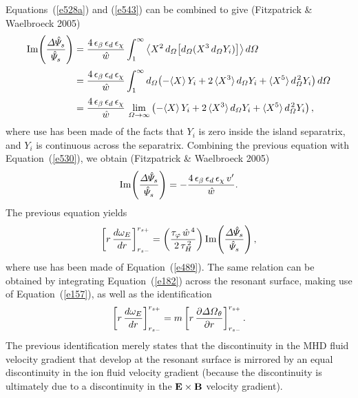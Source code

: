 \documentclass[notitlepage,12pt]{article}
\begin{document}
Equations~(\ref{e528a}) and (\ref{e543}) can be combined to give (Fitzpatrick \& Waelbroeck 2005)
\begin{align}
{\rm Im}\!\left(\frac{{\mit\Delta}\hat{\mit\Psi}_s}{\hat{\mit\Psi}_s}\right) &=\frac{4\,\epsilon_\beta\,\epsilon_d\,\epsilon_\chi}{\hat{w}}\int_1^\infty
\left\langle X^{2}\,d_{\mit\Omega}\!\left[d_{\mit\Omega}(X^3\,d_{\mit\Omega}Y_i)\right]\right\rangle d{\mit\Omega}\nonumber\\[0.5ex]
&=\frac{4\,\epsilon_\beta\,\epsilon_d\,\epsilon_\chi}{\hat{w}}\int_1^\infty d_{\mit\Omega}\!\left(-\langle X\rangle\,Y_i
+2\,\langle X^3\rangle\,d_{\mit\Omega} Y_i + \langle X^5\rangle\,d_{\mit\Omega}^{\,2} Y_i\right)d{\mit\Omega}\nonumber\\[0.5ex]
&= \frac{4\,\epsilon_\beta\,\epsilon_d\,\epsilon_\chi}{\hat{w}}\,\lim_{\mit\Omega\rightarrow\infty}\left(-\langle X\rangle\,Y_i
+2\,\langle X^3\rangle\,d_{\mit\Omega} Y_i + \langle X^5\rangle\,d_{\mit\Omega}^{\,2} Y_i\right),
\end{align}
where use has been made of the facts that $Y_i$ is zero inside the island separatrix, and $Y_i$ is continuous across the separatrix.
Combining the previous equation with Equation~(\ref{e530}), we obtain (Fitzpatrick \& Waelbroeck 2005)
\begin{equation}\label{e545}
{\rm Im}\!\left(\frac{{\mit\Delta}\hat{\mit\Psi}_s}{\hat{\mit\Psi}_s}\right)  =- \frac{4\,\epsilon_\beta\,\epsilon_d\,\epsilon_\chi\,v'}{\hat{w}}.
\end{equation}
The previous equation yields
\begin{equation}
\left[r\,\frac{d\omega_E}{dr}\right]_{r_{s-}}^{r_{s+}} = \left(\frac{\tau_\varphi\,\hat{w}^{\,4}}{2\,\tau_H^{\,2}}\right){\rm Im}\!\left(\frac{{\mit\Delta}\hat{\mit\Psi}_s}{\hat{\mit\Psi}_s}\right),
\end{equation}
where use has been made of Equation~(\ref{e489}). The same relation can be obtained by integrating Equation~(\ref{e182}) across the resonant surface, making use of Equation~(\ref{e157}), as well as the
identification
\begin{equation}
\left[r\,\frac{d\omega_E}{dr}\right]_{r_{s-}}^{r_{s+}} = m\left[r\,\frac{\partial{\mit\Delta\Omega}_\theta}{\partial r}\right]_{r_{s-}}^{r_{s+}}.
\end{equation}
The previous identification  merely states that the  discontinuity in the MHD fluid velocity gradient that develop at the resonant
surface is mirrored by an equal discontinuity in the ion fluid velocity gradient (because the discontinuity is ultimately due to 
a discontinuity in the ${\bf E}\times {\bf B}$ velocity gradient). 
\end{document}
